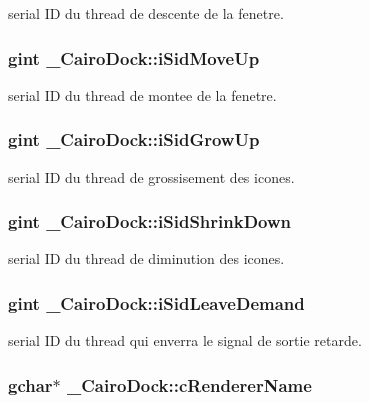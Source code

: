 serial ID du thread de descente de la fenetre. 

\subsubsection{\setlength{\rightskip}{0pt plus 5cm}gint {\bf \_\-CairoDock::iSidMoveUp}}\label{struct__CairoDock_c0126219b7bc08457b720a942a4591bc}


serial ID du thread de montee de la fenetre. 

\subsubsection{\setlength{\rightskip}{0pt plus 5cm}gint {\bf \_\-CairoDock::iSidGrowUp}}\label{struct__CairoDock_8bd5c9c83a354366f9736759634c11f8}


serial ID du thread de grossisement des icones. 

\subsubsection{\setlength{\rightskip}{0pt plus 5cm}gint {\bf \_\-CairoDock::iSidShrinkDown}}\label{struct__CairoDock_9d697f0abf14e88492e4795317b4b3c3}


serial ID du thread de diminution des icones. 

\subsubsection{\setlength{\rightskip}{0pt plus 5cm}gint {\bf \_\-CairoDock::iSidLeaveDemand}}\label{struct__CairoDock_ce8631cc9f3338f254327cfa8dfe1dda}


serial ID du thread qui enverra le signal de sortie retarde. 

\subsubsection{\setlength{\rightskip}{0pt plus 5cm}gchar$\ast$ {\bf \_\-CairoDock::cRendererName}}\label{struct__CairoDock_9376e8aa1cdcecb260fa1e838cbe0925}


